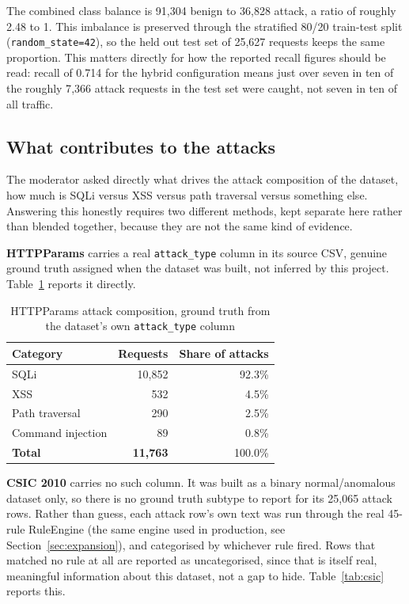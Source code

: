 \documentclass{llncs}
\begin{document}
The combined class balance is 91{,}304 benign to 36{,}828 attack, a
ratio of roughly 2.48 to 1. This imbalance is preserved through the
stratified 80/20 train-test split (\texttt{random\_state=42}), so the
held out test set of 25{,}627 requests keeps the same proportion. This
matters directly for how the reported recall figures should be read:
recall of 0.714 for the hybrid configuration means just over seven in
ten of the roughly 7{,}366 attack requests in the test set were caught,
not seven in ten of all traffic.

\subsection{What contributes to the attacks}

The moderator asked directly what drives the attack composition of the
dataset, how much is SQLi versus XSS versus path traversal versus
something else. Answering this honestly requires two different methods,
kept separate here rather than blended together, because they are not
the same kind of evidence.

\textbf{HTTPParams} carries a real \texttt{attack\_type} column in its
source CSV, genuine ground truth assigned when the dataset was built,
not inferred by this project. Table~\ref{tab:httpparams} reports it
directly.

\begin{table}[h]
\centering
\caption{HTTPParams attack composition, ground truth from the dataset's own \texttt{attack\_type} column}
\label{tab:httpparams}
\begin{tabular}{lrr}
\toprule
\textbf{Category} & \textbf{Requests} & \textbf{Share of attacks} \\
\midrule
SQLi & 10{,}852 & 92.3\% \\
XSS & 532 & 4.5\% \\
Path traversal & 290 & 2.5\% \\
Command injection & 89 & 0.8\% \\
\midrule
\textbf{Total} & \textbf{11{,}763} & 100.0\% \\
\bottomrule
\end{tabular}
\end{table}

\textbf{CSIC 2010} carries no such column. It was built as a binary
normal/anomalous dataset only, so there is no ground truth subtype to
report for its 25{,}065 attack rows. Rather than guess, each attack
row's own text was run through the real 45-rule RuleEngine (the same
engine used in production, see Section~\ref{sec:expansion}), and
categorised by whichever rule fired. Rows that matched no rule at all
are reported as uncategorised, since that is itself real, meaningful
information about this dataset, not a gap to hide.
Table~\ref{tab:csic} reports this.
\end{document}
